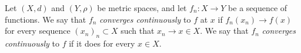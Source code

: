\documentclass[12pt]{article}
\begin{document}
Let $(X,d)$ and $(Y,\rho)$ be metric spaces, and let $f_n:X\longrightarrow Y$ be a sequence of functions. We say that $f_n$ \textit{converges continuously} to $f$ at $x$ if $f_n(x_n)\longrightarrow f(x)$ for every sequence $(x_n)_n\subset X$ such that $x_n\longrightarrow x \in X$. We say that $f_n$ \emph{converges continuously} to $f$ if it does for every $x \in X$.
\end{document}
